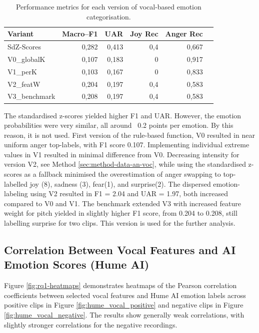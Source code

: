 \begin{table}[ht]
    \centering
    \begin{tabular}{lrrrrr}
      \toprule
      Variant       & Macro–F1 &   UAR  & Joy Rec & Anger Rec  \\
      \midrule
      SdZ-Scores    &   0,282  &  0,413 &    0,4  &     0,667 &        \\
      V0\_globalK   &   0,107  &  0,183 &    0    &     0,917 &        \\
      V1\_perK      &   0,103  &  0,167 &    0    &     0,833 &        \\
      V2\_featW    &   0,204  &  0,197 &    0,4  &     0,583 &        \\
      V3\_benchmark     &   0,208  &  0,197 &    0,4  &     0,583 &        \\
      \bottomrule
    \end{tabular}
    \caption{Performance metrics for each version of vocal-based emotion categorisation.}
    \label{tab:rq1_categor.func-stats}
  \end{table}
  The standardised z-scores yielded higher F1 and UAR. However, the emotion probabilities were very similar, all around ~0.2 points per emotion. By this reason, it is not used. 
  First version of the rule-based function, V0 resulted in near uniform anger top-labels, with F1 score 0.107. Implementing individual extreme values in V1 resulted in minimal difference from V0.
  Decreasing intensity for version V2, see Method \ref{sec:method-data-an-voc}, while using the standardised z-scores as a fallback minimised the overestimation of anger swapping to top-labelled joy (8), sadness (3), fear(1), and surprise(2).
   The dispersed emotion-labeling using V2 resulted in F1 = 2.04 and UAR = 1.97, both increased compared to V0 and V1. 
  The benchmark extended V3 with increased feature weight for pitch yielded in slightly higher F1 score, from 0.204 to 0.208, still labelling surprise for two clips. This version is used for the further analysis. 
  

\subsection{Correlation Between Vocal Features and AI Emotion Scores (Hume AI)}
Figure \ref{fig:rq1-heatmaps} demonstrates heatmaps of the Pearson correlation coefficients between selected vocal features and Hume AI emotion labels across positive clips in Figure \ref{fig:hume_vocal_positive} and negative clips in Figure \ref{fig:hume_vocal_negative}. The results show generally weak correlations, with slightly stronger correlations for the negative recordings.  

